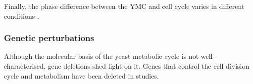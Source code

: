 Finally, the phase difference between the YMC and cell cycle varies in different conditions %
\citep{ewaldYeastCyclinDependentKinase2016}. %

\subsubsection{Genetic perturbations}
\label{subsubsec:intro-ymc-perturbations-genetic}

Although the molecular basis of the yeast metabolic cycle is not well-characterised, gene deletions shed light on it.
Genes that control the cell division cycle and metabolism have been deleted in studies.


